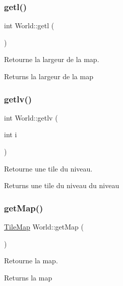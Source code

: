 \subsubsection{\texorpdfstring{getl()}{getl()}}
{\footnotesize\ttfamily int World\+::getl (\begin{DoxyParamCaption}{ }\end{DoxyParamCaption})}



Retourne la largeur de la map. 

\begin{DoxyReturn}{Returns}
la largeur de la map 
\end{DoxyReturn}
\mbox{\label{classWorld_a2439134de6a6ca2a66539d9f7ac35f4f}} 
\subsubsection{\texorpdfstring{getlv()}{getlv()}}
{\footnotesize\ttfamily int World\+::getlv (\begin{DoxyParamCaption}\item[{int}]{i }\end{DoxyParamCaption})}



Retourne une tile du niveau. 

\begin{DoxyReturn}{Returns}
une tile du niveau du niveau 
\end{DoxyReturn}
\mbox{\label{classWorld_ac686b2503a9315f76bd93c362ee08520}} 
\subsubsection{\texorpdfstring{get\+Map()}{getMap()}}
{\footnotesize\ttfamily \hyperlink{classTileMap}{Tile\+Map} World\+::get\+Map (\begin{DoxyParamCaption}{ }\end{DoxyParamCaption})}



Retourne la map. 

\begin{DoxyReturn}{Returns}
la map 
\end{DoxyReturn}
\mbox{\label{classWorld_afd3ebf8f3c57ce62653ff620a4efd3e6}} 
